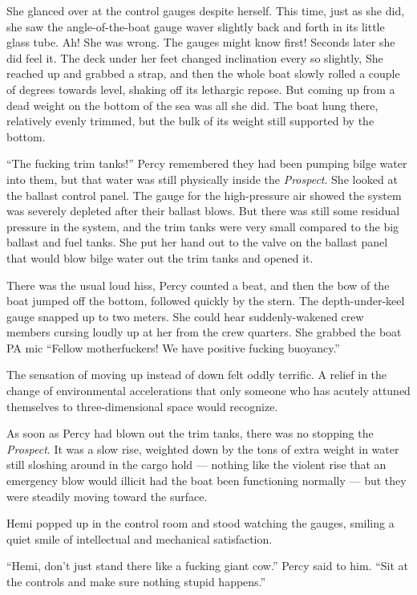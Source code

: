 \documentclass[]{article}
\begin{document}
\begin{multicols}{2}
She glanced over at the control gauges despite herself. This time, just
as she did, she saw the angle-of-the-boat gauge waver slightly back and
forth in its little glass tube. Ah! She was wrong. The gauges might know
first! Seconds later she did feel it. The deck under her feet changed
inclination every so slightly, She reached up and grabbed a strap, and
then the whole boat slowly rolled a couple of degrees towards level,
shaking off its lethargic repose. But coming up from a dead weight on
the bottom of the sea was all she did. The boat hung there, relatively
evenly trimmed, but the bulk of its weight still supported by the
bottom.

``The fucking trim tanks!'' Percy remembered they had been pumping bilge
water into them, but that water was still physically inside the
\emph{Prospect}. She looked at the ballast control panel. The gauge for
the high-pressure air showed the system was severely depleted after
their ballast blows. But there was still some residual pressure in the
system, and the trim tanks were very small compared to the big ballast
and fuel tanks. She put her hand out to the valve on the ballast panel
that would blow bilge water out the trim tanks and opened it.

There was the usual loud hiss, Percy counted a beat, and then the bow of
the boat jumped off the bottom, followed quickly by the stern. The
depth-under-keel gauge snapped up to two meters. She could hear
suddenly-wakened crew members cursing loudly up at her from the crew
quarters. She grabbed the boat PA mic ``Fellow motherfuckers! We have
positive fucking buoyancy.''

The sensation of moving up instead of down felt oddly terrific. A relief
in the change of environmental accelerations that only someone who has
acutely attuned themselves to three-dimensional space would recognize.

As soon as Percy had blown out the trim tanks, there was no stopping the
\emph{Prospect}. It was a slow rise, weighted down by the tons of extra
weight in water still sloshing around in the cargo hold --- nothing like
the violent rise that an emergency blow would illicit had the boat been
functioning normally --- but they were steadily moving toward the
surface.

Hemi popped up in the control room and stood watching the gauges,
smiling a quiet smile of intellectual and mechanical satisfaction.

``Hemi, don't just stand there like a fucking giant cow.'' Percy said to
him. ``Sit at the controls and make sure nothing stupid happens.''


\end{multicols}
\end{document}
